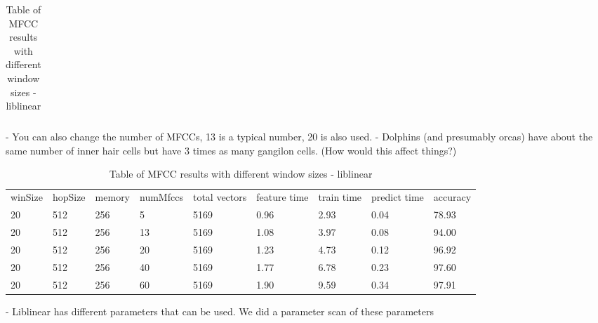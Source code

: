 \documentclass[12pt,oneside]{book}
\begin{document}
\begin{table}
\begin{tabular}{|l|l|l|l|l|}
\hline


\hline
\end{tabular}
\caption{Table of MFCC results with different window sizes - liblinear}
\label{table:obv-1-mfcc}
\end{table}


%
%

- You can also change the number of MFCCs, 13 is a typical number, 20
is also used.
- Dolphins (and presumably orcas) have about the same number of inner
hair cells but have 3 times as many gangilon cells.  (How would this
affect things?)


\begin{table}
\begin{tabular}{|l|l|l|l|l|l|l|l|l|}
\hline

winSize         & hopSize         & memory          & numMfccs        & total vectors   & feature time    & train time      & predict time    & accuracy        \\
20              & 512             & 256             & 5               & 5169            & 0.96            & 2.93            & 0.04            & 78.93           \\
20              & 512             & 256             & 13              & 5169            & 1.08            & 3.97            & 0.08            & 94.00           \\
20              & 512             & 256             & 20              & 5169            & 1.23            & 4.73            & 0.12            & 96.92           \\
20              & 512             & 256             & 40              & 5169            & 1.77            & 6.78            & 0.23            & 97.60           \\
20              & 512             & 256             & 60              & 5169            & 1.90            & 9.59            & 0.34            & 97.91           \\

\hline
\end{tabular}
\caption{Table of MFCC results with different window sizes - liblinear}
\label{table:obv-2-numMfcc}
\end{table}

%
%

- Liblinear has different parameters that can be used.  We did a
parameter scan of these parameters
\end{document}
